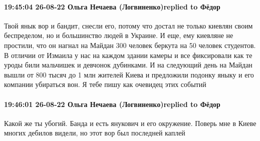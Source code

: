  
 
 
 
 

\paragraph{19:45:04 26-08-22 Ольга Нечаева (Логвиненко)replied to Фёдор}

Твой янык вор и бандит, снесли его, потому что достал не только киевлян своим
беспределом, но и большинство людей в Украине. И еще, ему киевляне не простили,
что он нагнал на Майдан 300 человек беркута на 50 человек студентов. В отличии
от Измаила у нас на каждом здании камеры и все фиксировали как те уроды били
мальчишек и девчонок дубинками. И на следующий день на Майдан вышли от 800
тысяч до 1 млн жителей Киева и предложили подонку яныку и его компании
убираться вон. Я тебе пишу как очевидец этих событий

\paragraph{19:46:01 26-08-22 Ольга Нечаева (Логвиненко)replied to Фёдор}

Какой же ты убогий. Банда и есть янукович и его окружение. Поверь мне в Киеве
многих дебилов видели, но этот вор был последней каплей
